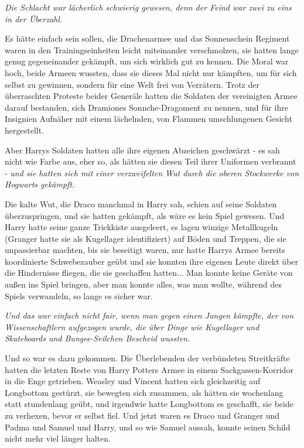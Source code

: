 \emph{Die Schlacht war lächerlich schwierig gewesen, denn der Feind war zwei zu
eins in der Überzahl.}

Es hätte einfach sein sollen, die Drachenarmee und das Sonnenschein Regiment
waren in den Trainingseinheiten leicht miteinander verschmolzen, sie hatten
lange genug gegeneinander gekämpft, um sich wirklich gut zu kennen. Die Moral
war hoch, beide Armeen wussten, dass sie dieses Mal nicht nur kämpften, um für
sich selbst zu gewinnen, sondern für eine Welt frei von Verrätern. Trotz der
überraschten Proteste beider Generäle hatten die Soldaten der vereinigten Armee
darauf bestanden, sich Dramiones Sonnche-Dragoment zu nennen, und für ihre
Insignien Aufnäher mit einem lächelnden, von Flammen umschlungenen Gesicht
hergestellt.

Aber Harrys Soldaten hatten alle ihre eigenen Abzeichen geschwärzt - es sah
nicht wie Farbe aus, eher so, als hätten sie diesen Teil ihrer Uniformen
verbrannt - \emph{und sie hatten sich mit einer verzweifelten Wut durch die
oberen Stockwerke von Hogwarts gekämpft.}

Die kalte Wut, die Draco manchmal in Harry sah, schien auf seine Soldaten
überzuspringen, und sie hatten gekämpft, als wäre es kein Spiel gewesen. Und
Harry hatte seine ganze Trickkiste ausgeleert, es lagen winzige Metallkugeln
(Granger hatte sie als \glqq{}Kugellager\grqq{} identifiziert) auf Böden und
Treppen, die sie unpassierbar machten, bis sie beseitigt waren, nur hatte Harrys
Armee bereits koordinierte Schwebezauber geübt und sie konnten ihre eigenen
Leute direkt über die Hindernisse fliegen, die sie geschaffen hatten... Man
konnte keine Geräte von außen ins Spiel bringen, aber man konnte alles, was man
wollte, während des Spiels verwandeln, so lange es sicher war.

\emph{Und das war einfach nicht fair, wenn man gegen einen Jungen kämpfte, der
von Wissenschaftlern aufgezogen wurde, die über Dinge wie Kugellager und
Skateboards und Bungee-Seilchen Bescheid wussten.}

Und so war es dazu gekommen. Die Überlebenden der verbündeten Streitkräfte
hatten die letzten Reste von Harry Potters Armee in einem Sackgassen-Korridor in
die Enge getrieben. Weasley und Vincent hatten sich gleichzeitig auf Longbottom
gestürzt, sie bewegten sich zusammen, als hätten sie wochenlang statt
stundenlang geübt, und irgendwie hatte Longbottom es geschafft, sie beide zu
verhexen, bevor er selbst fiel. Und jetzt waren es Draco und Granger und Padma
und Samuel und Harry, und so wie Samuel aussah, konnte seinen Schild nicht mehr
viel länger halten.

